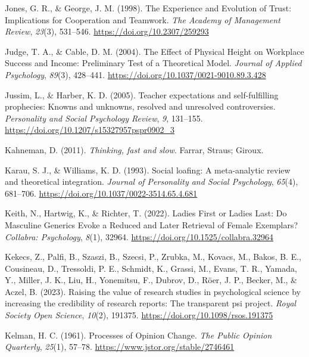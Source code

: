 \documentclass[
  letterpaper,
]{book}
\newlength{\cslhangindent}
\newenvironment{CSLReferences}[2] %
 {\begin{list}{}{%
  \setlength{\itemindent}{0pt}
  \setlength{\leftmargin}{0pt}
  \setlength{\parsep}{0pt}
  \ifodd #1
   \setlength{\leftmargin}{\cslhangindent}
   \setlength{\itemindent}{-1\cslhangindent}
  \fi
  \setlength{\itemsep}{#2\baselineskip}}}
 {\end{list}}
\begin{document}
\begin{CSLReferences}{1}{0}
Jones, G. R., \& George, J. M. (1998). The {Experience} and {Evolution}
of {Trust}: {Implications} for {Cooperation} and {Teamwork}. \emph{The
Academy of Management Review}, \emph{23}(3), 531--546.
\url{https://doi.org/10.2307/259293}

Judge, T. A., \& Cable, D. M. (2004). The {Effect} of {Physical}
{Height} on {Workplace} {Success} and {Income}: {Preliminary} {Test} of
a {Theoretical} {Model}. \emph{Journal of Applied Psychology},
\emph{89}(3), 428--441. \url{https://doi.org/10.1037/0021-9010.89.3.428}

Jussim, L., \& Harber, K. D. (2005). Teacher expectations and
self-fulfilling prophecies: Knowns and unknowns, resolved and unresolved
controversies. \emph{Personality and Social Psychology Review},
\emph{9}, 131--155. \url{https://doi.org/10.1207/s15327957pspr0902_3}

Kahneman, D. (2011). \emph{Thinking, fast and slow}. Farrar, Straus;
Giroux.

Karau, S. J., \& Williams, K. D. (1993). Social loafing: {A}
meta-analytic review and theoretical integration. \emph{Journal of
Personality and Social Psychology}, \emph{65}(4), 681--706.
\url{https://doi.org/10.1037/0022-3514.65.4.681}

Keith, N., Hartwig, K., \& Richter, T. (2022). Ladies {First} or
{Ladies} {Last}: {Do} {Masculine} {Generics} {Evoke} a {Reduced} and
{Later} {Retrieval} of {Female} {Exemplars}? \emph{Collabra:
Psychology}, \emph{8}(1), 32964.
\url{https://doi.org/10.1525/collabra.32964}

Kekecs, Z., Palfi, B., Szaszi, B., Szecsi, P., Zrubka, M., Kovacs, M.,
Bakos, B. E., Cousineau, D., Tressoldi, P. E., Schmidt, K., Grassi, M.,
Evans, T. R., Yamada, Y., Miller, J. K., Liu, H., Yonemitsu, F., Dubrov,
D., Röer, J. P., Becker, M., \& Aczel, B. (2023). Raising the value of
research studies in psychological science by increasing the credibility
of research reports: The transparent psi project. \emph{Royal Society
Open Science}, \emph{10}(2), 191375.
\url{https://doi.org/10.1098/rsos.191375}

Kelman, H. C. (1961). Processes of {Opinion} {Change}. \emph{The Public
Opinion Quarterly}, \emph{25}(1), 57--78.
\url{https://www.jstor.org/stable/2746461}


\end{CSLReferences}
\end{document}
